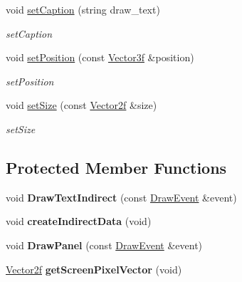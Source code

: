 \begin{DoxyCompactItemize}
\item 
void \hyperlink{classEngine_1_1TextElement_a5626e204bbd1eecf73697ee9267b6d5e}{set\+Caption} (string draw\+\_\+text)
\begin{DoxyCompactList}\small\item\em set\+Caption \end{DoxyCompactList}\item 
void \hyperlink{classEngine_1_1TextElement_a2a19554dbc2cb199242a97120808b150}{set\+Position} (const \hyperlink{classVector3}{Vector3f} \&position)
\begin{DoxyCompactList}\small\item\em set\+Position \end{DoxyCompactList}\item 
void \hyperlink{classEngine_1_1TextElement_a86f9de3aabf2cb0ee19afa81f58c5f62}{set\+Size} (const \hyperlink{classVector2}{Vector2f} \&size)
\begin{DoxyCompactList}\small\item\em set\+Size \end{DoxyCompactList}\end{DoxyCompactItemize}
\subsection*{Protected Member Functions}
\begin{DoxyCompactItemize}
\item 
\hypertarget{classEngine_1_1TextElement_ada161036ebe4ebccfd8eb0c01064351d}{}void {\bfseries Draw\+Text\+Indirect} (const \hyperlink{classEngine_1_1DrawEvent}{Draw\+Event} \&event)\label{classEngine_1_1TextElement_ada161036ebe4ebccfd8eb0c01064351d}

\item 
\hypertarget{classEngine_1_1TextElement_ae5e84512a2e616b467659405b0aebd0f}{}void {\bfseries create\+Indirect\+Data} (void)\label{classEngine_1_1TextElement_ae5e84512a2e616b467659405b0aebd0f}

\item 
\hypertarget{classEngine_1_1TextElement_a33fd994c8d6e6bc991d98ce5c6ce9068}{}void {\bfseries Draw\+Panel} (const \hyperlink{classEngine_1_1DrawEvent}{Draw\+Event} \&event)\label{classEngine_1_1TextElement_a33fd994c8d6e6bc991d98ce5c6ce9068}

\item 
\hypertarget{classEngine_1_1TextElement_a0707c71befbc96bcc937c76779037c62}{}\hyperlink{classVector2}{Vector2f} {\bfseries get\+Screen\+Pixel\+Vector} (void)\label{classEngine_1_1TextElement_a0707c71befbc96bcc937c76779037c62}

\end{DoxyCompactItemize}
